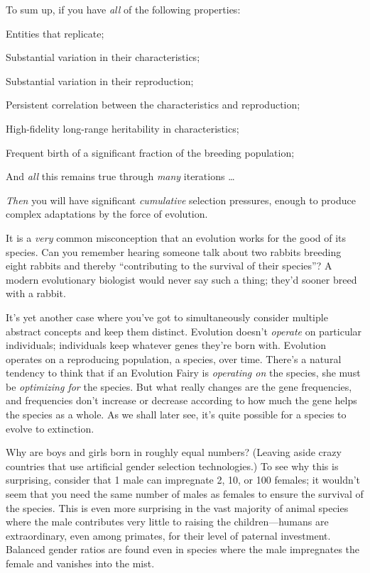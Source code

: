 {
 To sum up, if you have \textit{all} of the following properties:}

{
 Entities that replicate;}

{
 Substantial variation in their characteristics;}

{
 Substantial variation in their reproduction;}

{
 Persistent correlation between the characteristics and
reproduction;}

{
 High-fidelity long-range heritability in characteristics;}

{
 Frequent birth of a significant fraction of the breeding
population;}

{
 And \textit{all} this remains true through \textit{many}
iterations \ldots}

{
 \textit{Then} you will have significant \textit{cumulative}
selection pressures, enough to produce complex adaptations by the force
of evolution.}

\myendsectiontext


{
 It is a \textit{very} common misconception that an evolution works
for the good of its species. Can you remember hearing someone talk
about two rabbits breeding eight rabbits and thereby
``contributing to the survival of their
species''? A modern evolutionary biologist would
never say such a thing; they'd sooner breed with a
rabbit. }

{
 It's yet another case where you've
got to simultaneously consider multiple abstract concepts and keep them
distinct. Evolution doesn't \textit{operate} on
particular individuals; individuals keep whatever genes
they're born with. Evolution operates on a reproducing
population, a species, over time. There's a natural
tendency to think that if an Evolution Fairy is \textit{operating on}
the species, she must be \textit{optimizing for} the species. But what
really changes are the gene frequencies, and frequencies
don't increase or decrease according to how much the
gene helps the species as a whole. As we shall later see,
it's quite possible for a species to evolve to
extinction.}

{
 Why are boys and girls born in roughly equal numbers? (Leaving
aside crazy countries that use artificial gender selection
technologies.) To see why this is surprising, consider that 1 male can
impregnate 2, 10, or 100 females; it wouldn't seem that
you need the same number of males as females to ensure the survival of
the species. This is even more surprising in the vast majority of
animal species where the male contributes very little to raising the
children---humans are extraordinary, even among primates, for their
level of paternal investment. Balanced gender ratios are found even in
species where the male impregnates the female and vanishes into the
mist.}

